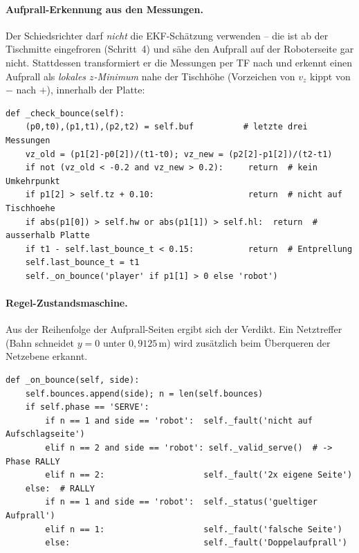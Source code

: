\paragraph{Aufprall-Erkennung aus den Messungen.} Der Schiedsrichter darf
\emph{nicht} die EKF-Schätzung verwenden -- die ist ab der Tischmitte eingefroren
(Schritt~4) und sähe den Aufprall auf der Roboterseite gar nicht. Stattdessen
transformiert er die Messungen  per TF nach  und
erkennt einen Aufprall als \emph{lokales $z$-Minimum} nahe der Tischhöhe (Vorzeichen
von $v_z$ kippt von $-$ nach $+$), innerhalb der Platte:
\begin{lstlisting}[style=py,caption={\code{match\_referee} -- Aufprall = $z$-Minimum auf Tischhöhe}]
def _check_bounce(self):
    (p0,t0),(p1,t1),(p2,t2) = self.buf          # letzte drei Messungen
    vz_old = (p1[2]-p0[2])/(t1-t0); vz_new = (p2[2]-p1[2])/(t2-t1)
    if not (vz_old < -0.2 and vz_new > 0.2):     return  # kein Umkehrpunkt
    if p1[2] > self.tz + 0.10:                   return  # nicht auf Tischhoehe
    if abs(p1[0]) > self.hw or abs(p1[1]) > self.hl:  return  # ausserhalb Platte
    if t1 - self.last_bounce_t < 0.15:           return  # Entprellung
    self.last_bounce_t = t1
    self._on_bounce('player' if p1[1] > 0 else 'robot')
\end{lstlisting}

\paragraph{Regel-Zustandsmaschine.} Aus der Reihenfolge der Aufprall-Seiten ergibt
sich der Verdikt. Ein Netztreffer (Bahn schneidet $y=0$ unter $0{,}9125\,$m) wird
zusätzlich beim Überqueren der Netzebene erkannt.
\begin{lstlisting}[style=py,caption={\code{match\_referee} -- Aufschlag-/Ballwechselregeln}]
def _on_bounce(self, side):
    self.bounces.append(side); n = len(self.bounces)
    if self.phase == 'SERVE':
        if n == 1 and side == 'robot':  self._fault('nicht auf Aufschlagseite')
        elif n == 2 and side == 'robot': self._valid_serve()  # -> Phase RALLY
        elif n == 2:                    self._fault('2x eigene Seite')
    else:  # RALLY
        if n == 1 and side == 'robot':  self._status('gueltiger Aufprall')
        elif n == 1:                    self._fault('falsche Seite')
        else:                           self._fault('Doppelaufprall')
\end{lstlisting}

